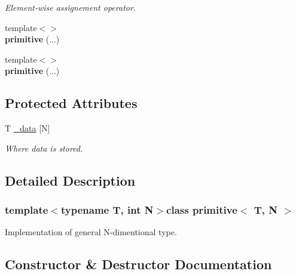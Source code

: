 \begin{DoxyCompactItemize}
\begin{DoxyCompactList}\small\item\em Element-\/wise assignement operator. \end{DoxyCompactList}\item 
\hypertarget{classprimitive_a867946b2d75fb1abecce0b4643b20e98}{}{\footnotesize template$<$$>$ }\\{\bfseries primitive} (...)\label{classprimitive_a867946b2d75fb1abecce0b4643b20e98}

\item 
\hypertarget{classprimitive_af96205d423f1166a81df3b21f640981e}{}{\footnotesize template$<$$>$ }\\{\bfseries primitive} (...)\label{classprimitive_af96205d423f1166a81df3b21f640981e}

\end{DoxyCompactItemize}
\subsection*{Protected Attributes}
\begin{DoxyCompactItemize}
\item 
\hypertarget{classprimitive_a8153a3df173a0e9a4fed4e8a900d9da3}{}T \hyperlink{classprimitive_a8153a3df173a0e9a4fed4e8a900d9da3}{\+\_\+data} \mbox{[}N\mbox{]}\label{classprimitive_a8153a3df173a0e9a4fed4e8a900d9da3}

\begin{DoxyCompactList}\small\item\em Where data is stored. \end{DoxyCompactList}\end{DoxyCompactItemize}


\subsection{Detailed Description}
\subsubsection*{template$<$typename T, int N$>$class primitive$<$ T, N $>$}

Implementation of general N-\/dimentional type. 

\subsection{Constructor \& Destructor Documentation}
\hypertarget{classprimitive_aa6d523d4980e21bfa1dd61dbef4e9410}{}
